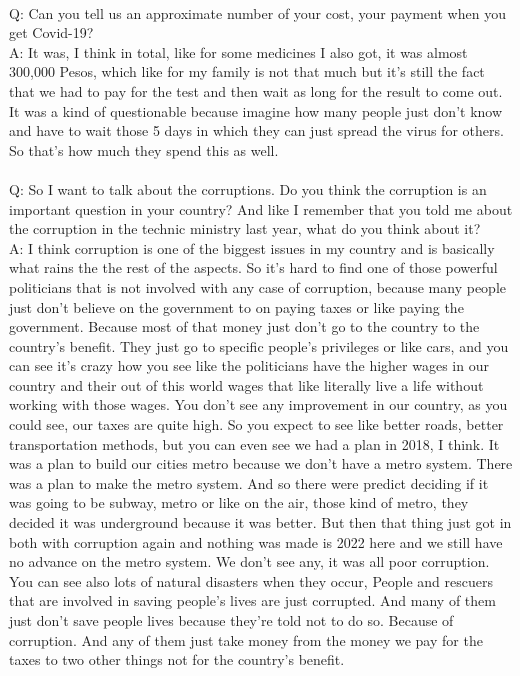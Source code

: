 \documentclass{phyasgn}\usepackage{nag}
\begin{document}
\\
Q: Can you tell us an approximate number of your cost, your payment when you get Covid-19?
\\
A: It was, I think in total, like for some medicines I also got, it was almost 300,000 Pesos, which like for my family is not that much but it’s still the fact that we had to pay for the test and then wait as long for the result to come out. It was a kind of questionable because imagine how many people just don't know and have to wait those 5 days in which they can just spread the virus for others. So that's how much they spend this as well.\\
\\
Q: So I want to talk about the corruptions. Do you think the corruption is an important question in your country? And like I remember that you told me about the corruption in the technic ministry last year, what do you think about it?\\
A: I think corruption is one of the biggest issues in my country and is basically what rains the the rest of the aspects. So it's hard to find one of those powerful politicians that is not involved with any case of corruption, because many people just don't believe on the government to on paying taxes or like paying the government. Because most of that money just don't go to the country to the country's benefit. They just go to specific people's privileges or like cars, and you can see it's crazy how you see like the politicians have the higher wages in our country and their out of this world wages that like literally live a life without working with those wages. You don't see any improvement in our country, as you could see, our taxes are quite high. So you expect to see like better roads, better transportation methods, but you can even see we had a plan in 2018, I think. It was a plan to build our cities metro because we don't have a metro system. There was a plan to make the metro system. And so there were predict deciding if it was going to be subway, metro or like on the air, those kind of metro, they decided it was underground because it was better. But then that thing just got in both with corruption again and nothing was made is 2022 here and we still have no advance on the metro system. We don't see any, it was all poor corruption. You can see also lots of natural disasters when they occur, People and rescuers that are involved in saving people's lives are just corrupted. And many of them just don't save people lives because they're told not to do so. Because of corruption. And any of them just take money from the money we pay for the taxes to two other things not for the country's benefit. \\
\end{document}
